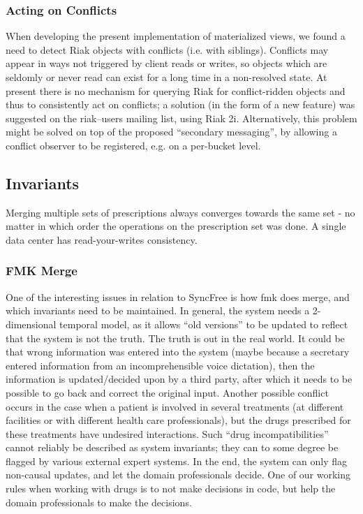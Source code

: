 \documentclass[11pt,a4paper]{report}
\begin{document}
\subsubsection{Acting on Conflicts}
When developing the present implementation of materialized views, we found a need to detect Riak objects with conflicts (i.e. with siblings). Conflicts may appear in ways not triggered by client reads or writes, so objects which are seldomly or never read can exist for a long time in a non-resolved state. At present there is no mechanism for querying Riak for conflict-ridden objects and thus to consistently act on conflicts; a solution (in the form of a new feature) was suggested on the riak--users mailing list, using Riak 2i.
Alternatively, this problem might be solved on top of the proposed ``secondary messaging'', by allowing a conflict observer to be registered, e.g. on a per-bucket level.

\subsection{Invariants}
Merging multiple sets of prescriptions always converges towards the same set - no matter in which order the operations on the prescription set was done.
A single data center has read-your-writes consistency.

\subsubsection{FMK Merge}
One of the interesting issues in relation to SyncFree is how \gls{fmk} does merge, and which invariants need to be maintained.
In general, the system needs a 2-dimensional temporal model, as it allows ``old versions'' to be updated to reflect that the system is not the truth. The truth is out in the real world. It could be that wrong information was entered into the system (maybe because a secretary entered information from an incomprehensible voice dictation), then the information is updated/decided upon by a third party, after which it needs to be possible to go back and correct the original input. Another possible conflict occurs in the case when a patient is involved in several treatments (at different facilities or with different health care professionals), but the drugs prescribed for these treatments have undesired interactions. Such ``drug incompatibilities'' cannot reliably be described as system invariants; they can to some degree be flagged by various external expert systems. In the end, the system can only flag non-causal updates, and let the domain professionals decide. One of our working rules when working with drugs is to not make decisions in code, but help the domain professionals to make the decisions.
\end{document}
